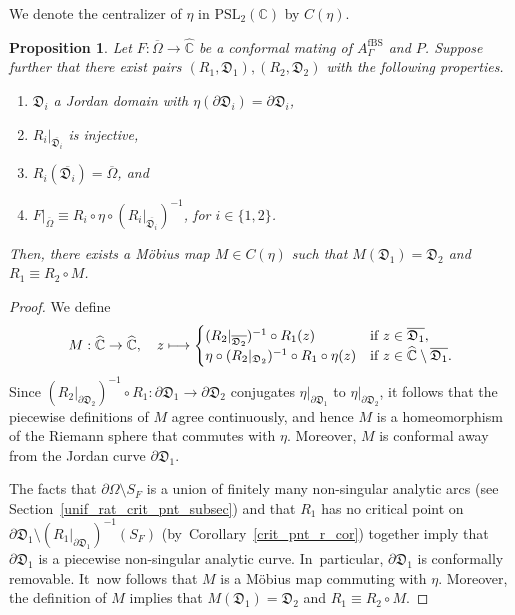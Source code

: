 \documentclass[JEP,XML,SOM,Unicode,NoFloatCountersInSection,published]{cedram}
\def\mto{\mathchoice{\longmapsto}{\mapsto}{\mapsto}{\mapsto}}
\newtheorem{proposition}[lemma]{Proposition}
\theoremstyle{definition}
\theoremstyle{remark}
\newcommand{\C}{\mathbb{C}}
\begin{document}
We denote the centralizer of $\eta$ in $\mathrm{PSL}_2(\C)$ by $C(\eta)$.

\begin{proposition}\label{unique_unif_prop}
Let $F:\overline{\Omega}\to\widehat{\C}$ be a conformal mating of $A_{\Gamma}^{\mathrm{fBS}}$ and $P$. Suppose further that there exist pairs $(R_1,\mathfrak{D}_1), (R_2,\mathfrak{D}_2)$ with the following properties.
\begin{enumerate}
\item $\mathfrak{D}_i$ a Jordan domain with $\eta(\partial\mathfrak{D}_i)=\partial\mathfrak{D}_i$,
\item $R_i\vert_{\overline{\mathfrak{D}_i}}$ is injective,
\item $R_i(\overline{\mathfrak{D}_i})=\overline{\Omega}$, and
\item $F\vert_{\overline{\Omega}}\equiv R_i\circ\eta\circ (R_i\vert_{\overline{\mathfrak{D}_i}})^{-1}$, for $i\in\{1,2\}$.
\end{enumerate}
Then, there exists a Möbius map $M\in C(\eta)$ such that $M(\mathfrak{D}_1)=\mathfrak{D}_2$ and $R_1\equiv R_2\circ M$.
\end{proposition}
\begin{proof}
We define
\[
M:\widehat{\C}\to\widehat{\C},\quad z\mto
\begin{cases}
(R_2\vert_{\overline{\mathfrak{D}_2}})^{-1}\circ R_1(z)&\text{if }z\in \overline{\mathfrak{D}_1},\\
\eta\circ(R_2\vert_{\mathfrak{D}_2})^{-1}\circ R_1\circ\eta(z)&\text{if }z\in \widehat{\C}\setminus\overline{\mathfrak{D}_1}.
\end{cases}
\]
Since $(R_2\vert_{\partial\mathfrak{D}_2})^{-1}\circ R_1:\partial\mathfrak{D}_1\to\partial\mathfrak{D}_2$ conjugates $\eta\vert_{\partial\mathfrak{D}_1}$ to $\eta\vert_{\partial\mathfrak{D}_2}$, it follows that the piecewise definitions of $M$ agree continuously, and hence $M$ is a homeomorphism of the Riemann sphere that commutes with $\eta$. Moreover, $M$ is conformal away from the Jordan curve $\partial\mathfrak{D}_1$.

The facts that $\partial\Omega\setminus S_F$ is a union of finitely many non-singular analytic arcs (see Section~\ref{unif_rat_crit_pnt_subsec}) and that $R_1$ has no critical point on $\partial\mathfrak{D}_1\setminus (R_1\vert_{\partial\mathfrak{D}_1})^{-1}(S_F)$ (by~Corollary~\ref{crit_pnt_r_cor}) together imply that $\partial\mathfrak{D}_1$ is a piecewise non-singular analytic curve. In~particular, $\partial\mathfrak{D}_1$ is conformally removable. It~now follows that $M$ is a Möbius map commuting with $\eta$.
Moreover, the definition of $M$ implies that $M(\mathfrak{D}_1)=\mathfrak{D}_2$ and $R_1\equiv R_2\circ M$.
\end{proof}
\end{document}
